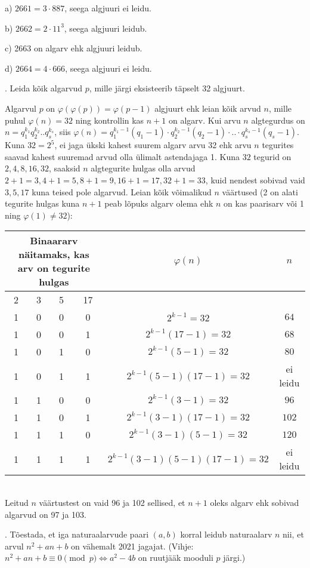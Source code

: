 \documentclass[a4paper, 10pt]{article}
\begin{document}
\bigskip
a) $2661=3\cdot887$, seega algjuuri ei leidu.

b) $2662=2\cdot11^3$, seega algjuuri leidub. 

c) 2663 on algarv ehk algjuuri leidub.

d) $2664=4\cdot 666$, seega algjuuri ei leidu.


\bigskip
{}. Leida kõik algarvud $p$, mille järgi eksisteerib täpselt 32 algjuurt.

\bigskip
Algarvul $p$ on $\varphi(\varphi(p))=\varphi(p-1)$ algjuurt ehk leian kõik arvud $n$, mille puhul $\varphi(n)=32$ ning kontrollin kas $n+1$ on algarv. Kui arvu $n$ algtegurdus on $n=q_1^{k_1}q_2^{k_2}..q_s^{k_s}$, siis $\varphi(n)=q_1^{k_1-1}(q_1-1)\cdot q_2^{k_2-1}(q_2-1)\cdot ..\cdot q_s^{k_s-1}(q_s-1)$. Kuna $32=2^5$, ei jaga ükski kahest suurem algarv arvu 32 ehk arvu $n$ tegurites saavad kahest suuremad arvud olla ülimalt astendajaga 1. Kuna $32$ tegurid on $2,4,8,16,32$, saaksid $n$ algtegurite hulgas olla arvud $2+1=3, 4+1=5, 8+1=9, 16+1=17, 32+1=33$, kuid nendest sobivad vaid $3,5,17$ kuna teised pole algarvud. Leian kõik võimalikud $n$ väärtused (2 on alati tegurite hulgas kuna $n+1$ peab lõpuks algarv olema ehk $n$ on kas paarisarv või 1 ning $\varphi(1)\neq32$):\\
\begin{tabular}{cccc|c|c}
\multicolumn{4}{c|}{Binaararv näitamaks, kas arv on tegurite hulgas} & $\varphi(n)$ & $n$\\
\hline
2&3&5&17&\\
\hline
\hline
1&0&0&0&$2^{k-1}=32$&$64$\\
\hline
1&0&0&1&$2^{k-1}(17-1)=32$&$68$\\
\hline
1&0&1&0&$2^{k-1}(5-1)=32$&$80$\\
\hline
1&0&1&1&$2^{k-1}(5-1)(17-1)=32$&ei leidu\\
\hline
1&1&0&0&$2^{k-1}(3-1)=32$&$96$\\
\hline
1&1&0&1&$2^{k-1}(3-1)(17-1)=32$&$102$\\
\hline
1&1&1&0&$2^{k-1}(3-1)(5-1)=32$&$120$\\
\hline
1&1&1&1&$2^{k-1}(3-1)(5-1)(17-1)=32$&ei leidu\\
\end{tabular}\\
Leitud $n$ väärtustest on vaid 96 ja 102 sellised, et $n+1$ oleks algarv ehk sobivad algarvud on 97 ja 103.
\bigskip

. Tõestada, et iga naturaalarvude paari $(a,b)$ korral leidub naturaalarv $n$ nii, et arvul $n^2+an+b$ on vähemalt 2021 jagajat. (Vihje: $n^2+an+b \equiv 0\pmod{p}\Longleftrightarrow a^2-4b$ on ruutjääk mooduli $p$ järgi.)
\end{document}
